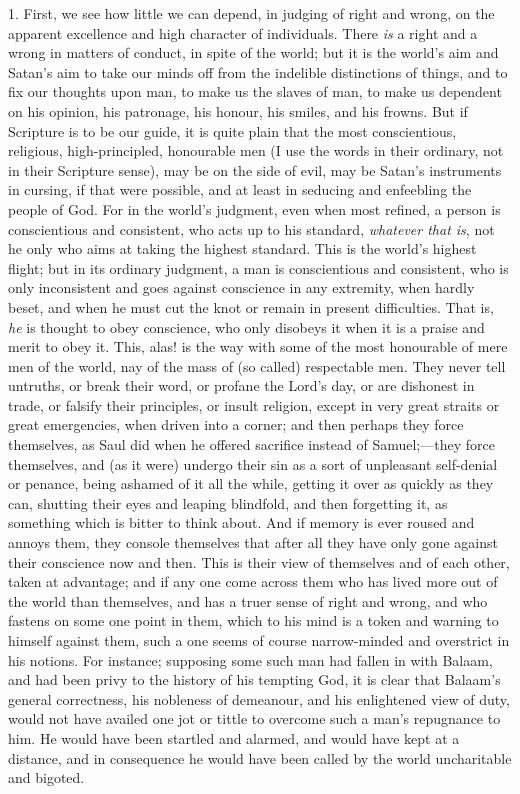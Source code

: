 1. First, we see how little we can depend, in judging of right and
wrong, on the apparent excellence and high character of individuals.
There \emph{is} a right and a wrong in matters of conduct, in spite of
the world; but it is the world's aim and Satan's aim to take our minds
off from the indelible distinctions of things, and to fix our thoughts
upon man, to make us the slaves of man, to make us dependent on his
opinion, his patronage, his honour, his smiles, and his frowns. But if
Scripture is to be our guide, it is quite plain that the most
conscientious, religious, high-principled, honourable men (I use the
words in their ordinary, not in their Scripture sense), may be on the
side of evil, may be Satan's instruments in cursing, if that were
possible, and at least in seducing and enfeebling the people of God.
For in the world's judgment, even when most refined, a person is
conscientious and consistent, who acts up to his standard, \emph{whatever
that is}, not he only who aims at taking the highest standard. This
is the world's highest flight; but in its ordinary judgment, a man is
conscientious and consistent, who is only inconsistent and goes
against conscience in any extremity, when hardly beset, and when he
must cut the knot or remain in present difficulties. That is, \emph{he}
is thought to obey conscience, who only disobeys it when it is a
praise and merit to obey it. This, alas! is the way with some of the
most honourable of mere men of the world, nay of the mass of (so
called) respectable men. They never tell untruths, or break their
word, or profane the Lord's day, or are dishonest in trade, or falsify
their principles, or insult religion, except in very great straits or
great emergencies, when driven into a corner; and then perhaps they
force themselves, as Saul did when he offered sacrifice instead of
Samuel;—they force themselves, and (as it were) undergo their sin as
a sort of unpleasant self-denial or penance, being ashamed of it all
the while, getting it over as quickly as they can, shutting their eyes
and leaping blindfold, and then forgetting it, as something which is
bitter to think about. And if memory is ever roused and annoys them,
they console themselves that after all they have only gone against
their conscience now and then. This is their view of themselves and of
each other, taken at advantage; and if any one come across them who
has lived more out of the world than themselves, and has a truer sense
of right and wrong, and who fastens on some one point in them, which
to his mind is a token and warning to himself against them, such a one
seems of course narrow-minded and overstrict in his notions. For
instance; supposing some such man had fallen in with Balaam, and had
been privy to the history of his tempting God, it is clear that
Balaam's general correctness, his nobleness of demeanour, and his
enlightened view of duty, would not have availed one jot or tittle to
overcome such a man's repugnance to him. He would have been startled
and alarmed, and would have kept at a distance, and in consequence he
would have been called by the world uncharitable and bigoted.

